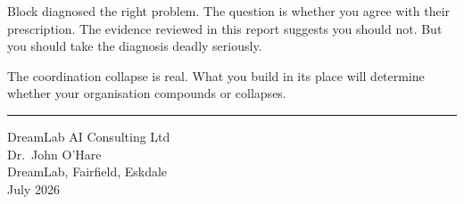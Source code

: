 Block diagnosed the right problem. The question is whether you agree with their prescription. The evidence reviewed in this report suggests you should not. But you should take the diagnosis deadly seriously.

The coordination collapse is real. What you build in its place will determine whether your organisation compounds or collapses.

\vspace{2cm}

\begin{center}
\textcolor{accentgold}{\rule{0.4\textwidth}{1pt}}

\vspace{0.5cm}

{\small\textcolor{navyblue!70!black}{DreamLab AI Consulting Ltd\\
Dr.\ John O'Hare\\
DreamLab, Fairfield, Eskdale\\
July 2026}}
\end{center}
